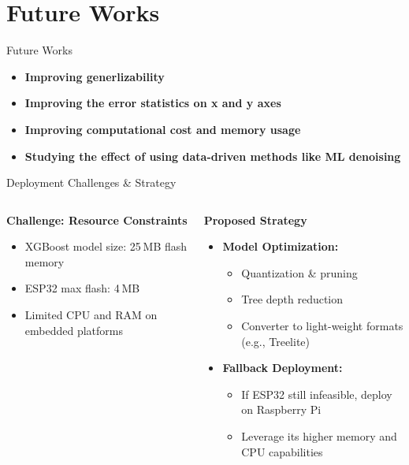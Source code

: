 \documentclass[aspectratio=169,xcolor=dvipsnames]{beamer}
\begin{document}
\section{Future Works}
\begin{frame}{Future Works}
  \begin{itemize}[<+->]
    \item \textbf{Improving generlizability}
    \item \textbf{Improving the error statistics on x and y axes}
    \item \textbf{Improving computational cost and memory usage}
    \item \textbf{Studying the effect of using data-driven methods like ML denoising}
  \end{itemize}
\end{frame}

\begin{frame}{Deployment Challenges \& Strategy}
\begin{columns}[T]
  \begin{column}{0.48\textwidth}
    \begin{block}{{\textbf{Challenge: Resource Constraints}}}
      \begin{itemize}[<+->]
        \item XGBoost model size: 25 MB flash memory  
        \item ESP32 max flash: 4 MB  
        \item Limited CPU and RAM on embedded platforms  
      \end{itemize}
    \end{block}
  \end{column}
  
  \begin{column}{0.48\textwidth}
    \begin{exampleblock}{{\textbf{Proposed Strategy}}}
      \begin{itemize}[<+->]
        \item \textbf{Model Optimization:}  
          \begin{itemize}
            \item Quantization \& pruning  
            \item Tree depth reduction  
            \item Converter to light-weight formats (e.g., Treelite)
          \end{itemize}
        \item \textbf{Fallback Deployment:}  
          \begin{itemize}
            \item If ESP32 still infeasible, deploy on Raspberry Pi  
            \item Leverage its higher memory and CPU capabilities  
          \end{itemize}
      \end{itemize}
    \end{exampleblock}
  \end{column}
\end{columns}
\end{frame} 
\end{document}
